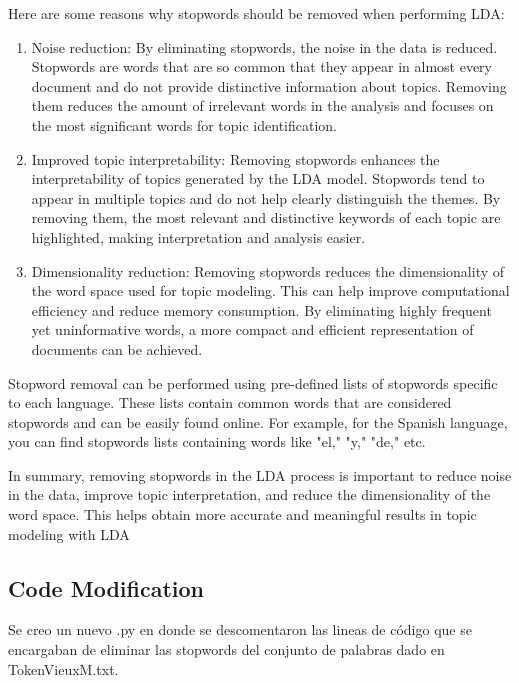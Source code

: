 \documentclass[10pt]{article} %
\begin{document}
	Here are some reasons why stopwords should be removed when performing LDA:
	\begin{enumerate}
		\item Noise reduction: By eliminating stopwords, the noise in the data is reduced. Stopwords are words that are so common that they appear in almost every document and do not provide distinctive information about topics. Removing them reduces the amount of irrelevant words in the analysis and focuses on the most significant words for topic identification.
		
		\item 	Improved topic interpretability: Removing stopwords enhances the interpretability of topics generated by the LDA model. Stopwords tend to appear in multiple topics and do not help clearly distinguish the themes. By removing them, the most relevant and distinctive keywords of each topic are highlighted, making interpretation and analysis easier.
		
		\item Dimensionality reduction: Removing stopwords reduces the dimensionality of the word space used for topic modeling. This can help improve computational efficiency and reduce memory consumption. By eliminating highly frequent yet uninformative words, a more compact and efficient representation of documents can be achieved.
	\end{enumerate}
	
	Stopword removal can be performed using pre-defined lists of stopwords specific to each language. These lists contain common words that are considered stopwords and can be easily found online. For example, for the Spanish language, you can find stopwords lists containing words like "el," "y," "de," etc.

	In summary, removing stopwords in the LDA process is important to reduce noise in the data, improve topic interpretation, and reduce the dimensionality of the word space. This helps obtain more accurate and meaningful results in topic modeling with LDA
	

	
	\subsection{Code Modification}
	
	Se creo un nuevo .py en donde se descomentaron las lineas de c\'odigo que se encargaban de eliminar las stopwords del conjunto de palabras dado en TokenVieuxM.txt.
	
\end{document}
